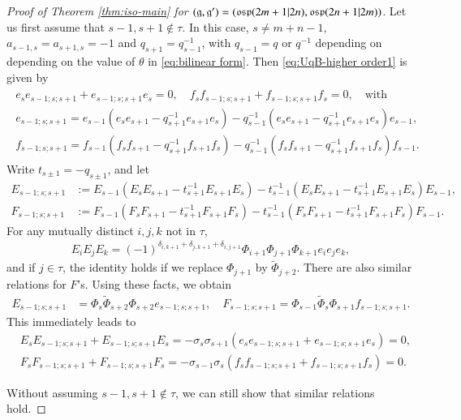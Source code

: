 \documentclass[12pt]{amsart}
\theoremstyle{definition}
\theoremstyle{remark}
\numberwithin{equation}{section}
\begin{document}
\begin{proof}[Proof of Theorem \ref{thm:iso-main} for $({{\mathfrak g}}, {{\mathfrak g}}')=({{\rm\mathfrak{osp}}}(2m+1|2n), {{\rm\mathfrak{osp}}}(2n+1|2m))$]
Let us first assume that $s-1,s+1\notin\tau$.
In this case, $s\neq m+n-1$, $a_{s-1,s}=a_{s+1,s}=-1$  and $q_{s+1}=q_{s-1}^{-1}$,
with $q_{s-1}=q$ or $q^{-1}$ depending on depending on
the value of  $\theta$ in \eqref{eq:bilinear form}.  Then \eqref{eq:UqB-higher order1} is given by
\begin{eqnarray*}
\begin{aligned}
e_s e_{s-1; s; s+1} +  e_{s-1; s; s+1}e_s=0,\quad
f_s f_{s-1; s; s+1} +  f_{s-1; s; s+1}f_s=0, \quad \text{with}\\
e_{s-1; s; s+1} = e_{s-1}(e_s e_{s+1}-q_{s+1}^{-1} e_{s+1} e_s)-
q_{s-1}^{-1}(e_s e_{s+1}-q_{s+1}^{-1} e_{s+1} e_s) e_{s-1},\\
f_{s-1; s; s+1} = f_{s-1}(f_s f_{s+1}-q_{s+1}^{-1} f_{s+1} f_s)-
q_{s-1}^{-1}(f_s f_{s+1}-q_{s+1}^{-1} f_{s+1} f_s) f_{s-1}.
\end{aligned}
\end{eqnarray*}
Write $t_{s\pm 1}= - q_{s\pm 1}$, and let
\[\begin{aligned}
E_{s-1;s;s+1}&:=E_{s-1}(E_sE_{s+1}-t_{s+1}^{-1}E_{s+1}E_s)-t_{s-1}^{-1}(E_sE_{s+1}- t_{s+1}^{-1} E_{s+1}E_s)E_{s-1}, \\
F_{s-1;s;s+1}&:=F_{s-1}(F_s F_{s+1}-t_{s+1}^{-1}F_{s+1}F_s)-t_{s-1}^{-1}(F_s F_{s+1}- t_{s+1}^{-1} F_{s+1}F_s)F_{s-1}.
\end{aligned}
\]
For any mutually distinct $i,j,k$ not in $\tau$,
\[
\begin{aligned}
E_iE_jE_k=(-1)^{\delta_{i,k+1}+\delta_{j,k+1}
+\delta_{i,j+1}}\Phi_{i+1}\Phi_{j+1}\Phi_{k+1}e_ie_je_k,
\end{aligned}\]
and if $j\in\tau$, the identity holds if we replace $\Phi_{j+1}$ by $\tilde{\Phi}_{j+2}$.
There are also similar relations for $F$'s.  Using these facts, we obtain
\[\begin{aligned}
E_{s-1;s;s+1}&=\Phi_s\tilde{\Phi}_{s+2}\Phi_{s+2}e_{s-1;s;s+1},
\quad
F_{s-1;s;s+1}=\Phi_{s-1}\tilde{\Phi}_{s}\Phi_{s+1}f_{s-1;s;s+1}.
\end{aligned}\]
This immediately leads to
\[\begin{aligned}
&E_sE_{s-1;s;s+1}+E_{s-1;s;s+1}E_s=-\sigma_s\sigma_{s+1}(e_se_{s-1;s;s+1}+e_{s-1;s;s+1}e_s)=0,\\
&F_sF_{s-1;s;s+1}+F_{s-1;s;s+1}F_s=-\sigma_{s-1}\sigma_{s}(f_sf_{s-1;s;s+1}+f_{s-1;s;s+1}f_s)=0.
\end{aligned}\]

Without assuming $s-1,s+1\notin\tau$, we can still show that similar relations hold.


\end{proof}
\end{document}
